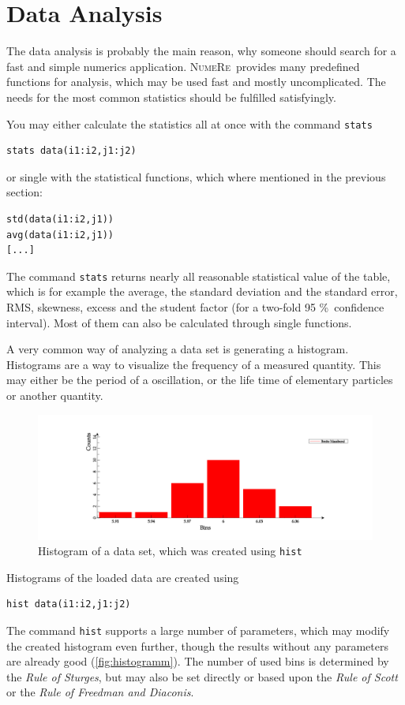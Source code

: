 \documentclass[DIV=14,headsepline,footsepline]{scrbook}
\newcommand{\NR}{\textsc{Nu\-me\-Re}}
\begin{document}
			\section{Data Analysis}
				The data analysis is probably the main reason, why someone should search for a fast and simple numerics application. \NR\ provides many predefined functions for analysis, which may be used fast and mostly uncomplicated. The needs for the most common statistics should be fulfilled satisfyingly.
				
				You may either calculate the statistics all at once with the command \lstinline+stats+
				\begin{lstlisting}
stats data(i1:i2,j1:j2)
				\end{lstlisting}
				or single with the statistical functions, which where mentioned in the previous section:
				\begin{lstlisting}
std(data(i1:i2,j1))
avg(data(i1:i2,j1))
[...]
				\end{lstlisting}
				The command \lstinline+stats+ returns nearly all reasonable statistical value of the table, which is for example the average, the standard deviation and the standard error, RMS, skewness, excess and the student factor (for a two-fold 95 \%\ confidence interval). Most of them can also be calculated through single functions.
				
				A very common way of analyzing a data set is generating a histogram. Histograms are a way to visualize the frequency of a measured quantity. This may either be the period of a oscillation, or the life time of elementary particles or another quantity.
				\begin{figure}[htb]%
					\centering
					\includegraphics[width=\textwidth]{_graphics/histogramm.png}
					\caption{Histogram of a data set, which was created using \lstinline{hist}}
					\label{fig:histogramm}
				\end{figure}
				
				Histograms of the loaded data are created using 
				\begin{lstlisting}
hist data(i1:i2,j1:j2)
				\end{lstlisting}
				The command \lstinline+hist+ supports a large number of parameters, which may modify the created histogram even further, though the results without any parameters are already good (\autoref{fig:histogramm}). The number of used bins is determined by the \emph{Rule of Sturges}, but may also be set directly or based upon the \emph{Rule of Scott} or the \emph{Rule of Freedman and Diaconis}.
				
\end{document}
